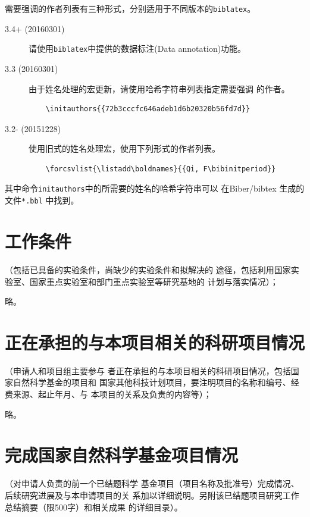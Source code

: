   需要强调的作者列表有三种形式，分别适用于不同版本的\texttt{biblatex}。
  \begin{description}
  \item[3.4+ (20160301)] 请使用\texttt{biblatex}中提供的数据标注(Data
    annotation)功能。
  \item[3.3 (20160301)] 由于姓名处理的宏更新，请使用哈希字符串列表指定需要强调
    的作者。
\begin{verbatim}
    \initauthors{{72b3cccfc646adeb1d6b20320b56fd7d}}
\end{verbatim}
  \item[3.2- (20151228)] 使用旧式的姓名处理宏，使用下列形式的作者列表。
\begin{verbatim}
    \forcsvlist{\listadd\boldnames}{{Qi, F\bibinitperiod}}
\end{verbatim}
  \end{description}
  其中命令\texttt{initauthors}中的所需要的姓名的哈希字符串可以
  在Biber/bibtex 生成的文件\texttt{*.bbl} 中找到。

\printbibliography[segment=\therefsegment,heading=cvtype,title={相关工作}]

\section{工作条件}{（包括已具备的实验条件，尚缺少的实验条件和拟解决的
  途径，包括利用国家实验室、国家重点实验室和部门重点实验室等研究基地的
  计划与落实情况）；}
\label{sec:condition}

略。

\section{正在承担的与本项目相关的科研项目情况}{（申请人和项目组主要参与
  者正在承担的与本项目相关的科研项目情况，包括国家自然科学基金的项目和
  国家其他科技计划项目，要注明项目的名称和编号、经费来源、起止年月、与
  本项目的关系及负责的内容等）；}
\label{sec:projects}

略。

\section{完成国家自然科学基金项目情况}{（对申请人负责的前一个已结题科学
  基金项目（项目名称及批准号）完成情况、后续研究进展及与本申请项目的关
  系加以详细说明。另附该已结题项目研究工作总结摘要（限500字）和相关成果
  的详细目录）。}
\label{sec:finished-project}

\newrefsegment

